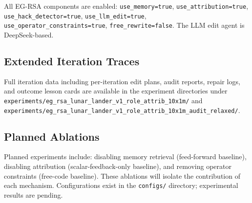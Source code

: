 \documentclass[11pt]{article}
\begin{document}
All EG-RSA components are enabled: \texttt{use\_memory=true}, \texttt{use\_attribution=true}, \texttt{use\_hack\_detector=true}, \texttt{use\_llm\_edit=true}, \texttt{use\_operator\_constraints=true}, \texttt{free\_rewrite=false}. The LLM edit agent is DeepSeek-based.

\subsection{Extended Iteration Traces}

Full iteration data including per-iteration edit plans, audit reports, repair logs, and outcome lesson cards are available in the experiment directories under \texttt{experiments/eg\_rsa\_lunar\_lander\_v1\_role\_attrib\_10x1m/} and \texttt{experiments/eg\_rsa\_lunar\_lander\_v1\_role\_attrib\_10x1m\_audit\_relaxed/}.

\subsection{Planned Ablations}

Planned experiments include: disabling memory retrieval (feed-forward baseline), disabling attribution (scalar-feedback-only baseline), and removing operator constraints (free-code baseline). These ablations will isolate the contribution of each mechanism. Configurations exist in the \texttt{configs/} directory; experimental results are pending.
\end{document}
